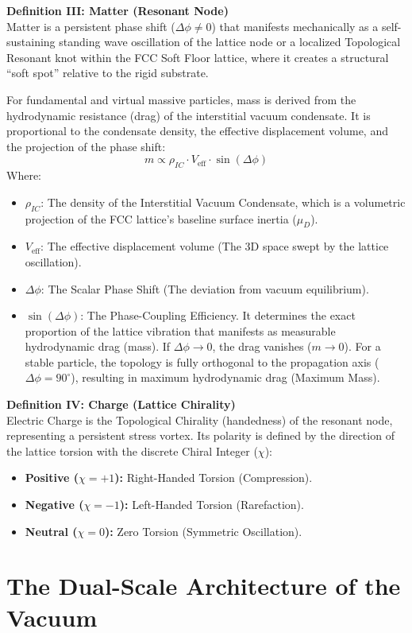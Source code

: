 \vspace{0.5em}
\noindent\textbf{Definition III: Matter (Resonant Node)}\\
Matter is a persistent phase shift ($\Delta\phi \neq 0$) that manifests mechanically as a self-sustaining standing wave oscillation of the lattice node or a localized Topological Resonant knot within the FCC Soft Floor lattice, where it creates a structural ``soft spot'' relative to the rigid substrate.

For fundamental and virtual massive particles, mass is derived from the hydrodynamic resistance (drag) of the interstitial vacuum condensate. It is proportional to the condensate density, the effective displacement volume, and the projection of the phase shift:
\begin{equation}
    m \propto \rho_{IC} \cdot V_{\text{eff}} \cdot \sin(\Delta\phi)
\end{equation}
Where:
\begin{itemize}
    \item $\rho_{IC}$: The density of the Interstitial Vacuum Condensate, which is a volumetric projection of the FCC lattice's baseline surface inertia ($\mu_D$).
    \item $V_{\text{eff}}$: The effective displacement volume (The 3D space swept by the lattice oscillation).
    \item $\Delta\phi$: The Scalar Phase Shift (The deviation from vacuum equilibrium).
    \item $\sin(\Delta\phi)$: The Phase-Coupling Efficiency. It determines the exact proportion of the lattice vibration that manifests as measurable hydrodynamic drag (mass). If $\Delta\phi \to 0$, the drag vanishes ($m \to 0$). For a stable particle, the topology is fully orthogonal to the propagation axis ($\Delta\phi = 90^\circ$), resulting in maximum hydrodynamic drag (Maximum Mass).
\end{itemize}

\vspace{0.5em}
\noindent\textbf{Definition IV: Charge (Lattice Chirality)}\\
Electric Charge is the Topological Chirality (handedness) of the resonant node, representing a persistent stress vortex. Its polarity is defined by the direction of the lattice torsion with the discrete Chiral Integer ($\chi$):
\begin{itemize}
    \item \textbf{Positive ($\chi = +1$):} Right-Handed Torsion (Compression).
    \item \textbf{Negative ($\chi = -1$):} Left-Handed Torsion (Rarefaction).
    \item \textbf{Neutral ($\chi = 0$):} Zero Torsion (Symmetric Oscillation).
\end{itemize}\chapter{The Dual-Scale Architecture of the Vacuum}

